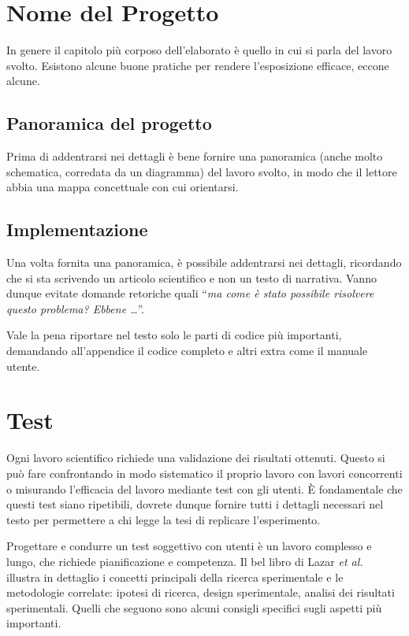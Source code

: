 \documentclass[12pt]{report}
\begin{document}
%
%

\chapter{Nome del Progetto}
\label{cap4}

In genere il capitolo più corposo dell'elaborato è quello in cui si parla del lavoro svolto. Esistono alcune buone pratiche per rendere l'esposizione efficace, eccone alcune.

\section{Panoramica del progetto}

Prima di addentrarsi nei dettagli è bene fornire una panoramica (anche molto schematica, corredata da un diagramma) del lavoro svolto, in modo che il lettore abbia una mappa concettuale con cui orientarsi.

\section{Implementazione}

Una volta fornita una panoramica, è possibile addentrarsi nei dettagli, ricordando che si sta scrivendo un articolo scientifico e non un testo di narrativa. Vanno dunque evitate domande retoriche quali ``\textit{ma come è stato possibile risolvere questo problema? Ebbene \ldots}''.

Vale la pena riportare nel testo solo le parti di codice più importanti, demandando all'appendice il codice completo e altri extra come il manuale utente.

%
%

\chapter{Test}
\label{chap:test}

Ogni lavoro scientifico richiede una validazione dei risultati ottenuti. Questo si può fare confrontando in modo sistematico il proprio lavoro con lavori concorrenti o misurando l'efficacia del lavoro mediante test con gli utenti. \`E fondamentale che questi test siano ripetibili, dovrete dunque fornire tutti i dettagli necessari nel testo per permettere a chi legge la tesi di replicare l'esperimento.

Progettare e condurre un test soggettivo con utenti \`e un lavoro complesso e lungo, che richiede pianificazione e competenza. Il bel libro di Lazar {\em et al.}~\cite{lazar2017methods} illustra in dettaglio i concetti principali della ricerca sperimentale e le metodologie correlate: ipotesi di ricerca, design sperimentale, analisi dei risultati sperimentali. Quelli che seguono sono alcuni consigli specifici sugli aspetti pi\`u importanti.
\end{document}
